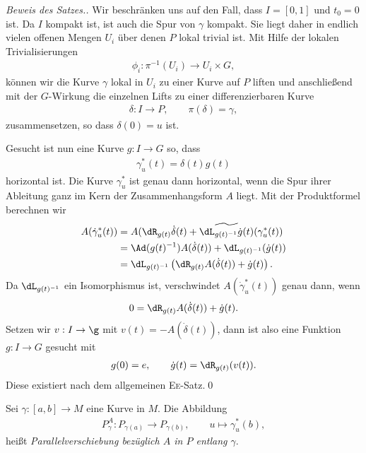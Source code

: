 \documentclass[%
	paper=a5,%
	fleqn,%
	DIV=18,%
	BCOR=0mm,
	fontsize=11pt,
	titlepage=false,%
	bibliography=totoc,
	DIV=18,%
	twoside=true,
	pdftitle=Riemannsche Geometrie,
	pdfauthor=Uwe Semmelmann,
	numbers=noendperiod]%
	{scrbook}
\begin{document}
\begin{proof}[Beweis des Satzes.]
Wir beschränken uns auf den Fall, dass $I=[0,1]$ und $t_0 = 0$ ist. Da $I$
kompakt ist, ist auch die Spur von $\gamma$ kompakt. Sie liegt daher
in endlich vielen offenen Mengen $U_i$ über denen $P$ lokal trivial ist. Mit
Hilfe der lokalen Trivialisierungen
\begin{align*}
\phi_i : \pi^{-1}(U_i)\to U_i\times G,
\end{align*}
können wir die Kurve $\gamma$ lokal in $U_i$ zu einer Kurve auf $P$ liften und
anschließend mit der $G$-Wirkung die einzelnen Lifts zu einer differenzierbaren
Kurve
\begin{align*}
\delta: I\to P,\qquad \pi(\delta) = \gamma,
\end{align*}
zusammensetzen, so dass $\delta(0) = u$ ist.

Gesucht ist nun eine Kurve $g: I\to G$ so, dass
\begin{align*}
\gamma_u^*(t) = \delta(t)g(t)
\end{align*} 
horizontal ist. Die Kurve $\gamma_u^*$ ist genau dann horizontal, wenn die Spur
ihrer Ableitung ganz im Kern der Zusammenhangsform $A$ liegt. Mit der
Produktformel berechnen wir
\begin{align*}
A(\dot{\gamma}_u^*(t)) &= 
A(\dR_{g(t)}\dot{\delta}(t) +
\widetilde{\dL_{g(t)^{-1}}\dot{g}(t)}(\gamma_u^*(t))\\
&=  \Ad(g(t)^{-1})A(\dot{\delta}(t)) + \dL_{g(t)^{-1}}(\dot{g}(t))\\
&= \dL_{g(t)^{-1}}\left(\dR_{g(t)}A(\dot{\delta}(t)) + \dot{g}(t)\right).
\end{align*}
Da $\dL_{g(t)^{-1}}$ ein Isomorphismus ist, verschwindet
$A(\dot{\gamma}_u^*(t))$ genau dann, wenn
\begin{align*}
0 = \dR_{g(t)}A(\dot{\delta}(t)) + \dot{g}(t).
\end{align*}
Setzen wir $v : I\to \g$ mit $v(t) = -A(\dot{\delta}(t))$, dann ist also eine
Funktion $g: I\to G$ gesucht mit
\begin{align*}
g(0) = e,\qquad \dot{g}(t) = \dR_{g(t)}(v(t)).
\end{align*}
Diese existiert nach dem allgemeinen \textsc{Ee}-Satz.\qed
\end{proof}

\begin{defn}
Sei $\gamma: [a,b]\to M$ eine Kurve in $M$. Die Abbildung
\begin{align*}
P_\gamma^A : P_{\gamma(a)}\to P_{\gamma(b)},\qquad u\mapsto \gamma_u^*(b),
\end{align*}
heißt \emph{Parallelverschiebung bezüglich $A$ in $P$ entlang $\gamma$}. \fish
\end{defn}
\end{document}
